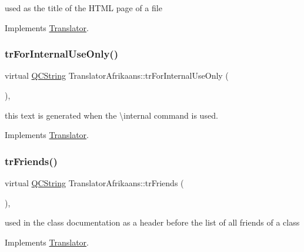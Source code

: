 used as the title of the H\+T\+ML page of a file 

Implements \mbox{\hyperlink{class_translator}{Translator}}.

\mbox{\label{class_translator_afrikaans_aaa1eeef0c2523e060d34d3bd8321a5da}} 
\subsubsection{\texorpdfstring{trForInternalUseOnly()}{trForInternalUseOnly()}}
{\footnotesize\ttfamily virtual \mbox{\hyperlink{class_q_c_string}{Q\+C\+String}} Translator\+Afrikaans\+::tr\+For\+Internal\+Use\+Only (\begin{DoxyParamCaption}{ }\end{DoxyParamCaption})\hspace{0.3cm}{\ttfamily [inline]}, {\ttfamily [virtual]}}

this text is generated when the \textbackslash{}internal command is used. 

Implements \mbox{\hyperlink{class_translator}{Translator}}.

\mbox{\label{class_translator_afrikaans_a3224d1aa397321d03ba7f50f9611f7c7}} 
\subsubsection{\texorpdfstring{trFriends()}{trFriends()}}
{\footnotesize\ttfamily virtual \mbox{\hyperlink{class_q_c_string}{Q\+C\+String}} Translator\+Afrikaans\+::tr\+Friends (\begin{DoxyParamCaption}{ }\end{DoxyParamCaption})\hspace{0.3cm}{\ttfamily [inline]}, {\ttfamily [virtual]}}

used in the class documentation as a header before the list of all friends of a class 

Implements \mbox{\hyperlink{class_translator}{Translator}}.

\mbox{\label{class_translator_afrikaans_ad4b360a7eb68e05c2dd87ac4cfec3fe4}} 
